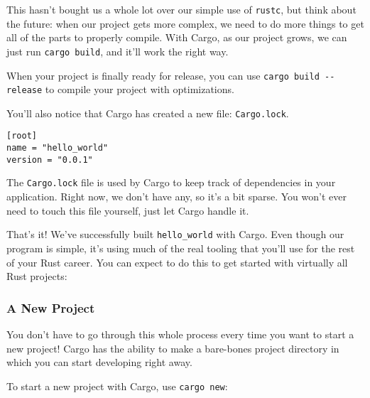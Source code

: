 \documentclass[a4paper,]{book}
\newenvironment{Shaded}{\begin{snugshade}}{\end{snugshade}}
\newcommand{\KeywordTok}[1]{\textcolor[rgb]{0.13,0.29,0.53}{\textbf{{#1}}}}
\newcommand{\NormalTok}[1]{{#1}}
\begin{document}
This hasn't bought us a whole lot over our simple use of \texttt{rustc},
but think about the future: when our project gets more complex, we need
to do more things to get all of the parts to properly compile. With
Cargo, as our project grows, we can just run \texttt{cargo\ build}, and
it'll work the right way.

When your project is finally ready for release, you can use
\texttt{cargo\ build\ -\/-release} to compile your project with
optimizations.

You'll also notice that Cargo has created a new file:
\texttt{Cargo.lock}.

\begin{verbatim}
[root]
name = "hello_world"
version = "0.0.1"
\end{verbatim}

The \texttt{Cargo.lock} file is used by Cargo to keep track of
dependencies in your application. Right now, we don't have any, so it's
a bit sparse. You won't ever need to touch this file yourself, just let
Cargo handle it.

That's it! We've successfully built \texttt{hello\_world} with Cargo.
Even though our program is simple, it's using much of the real tooling
that you'll use for the rest of your Rust career. You can expect to do
this to get started with virtually all Rust projects:

\begin{Shaded}
\end{Shaded}

\subsubsection{A New Project}\label{a-new-project}

You don't have to go through this whole process every time you want to
start a new project! Cargo has the ability to make a bare-bones project
directory in which you can start developing right away.

To start a new project with Cargo, use \texttt{cargo\ new}:

\begin{Shaded}
\end{Shaded}
\end{document}
